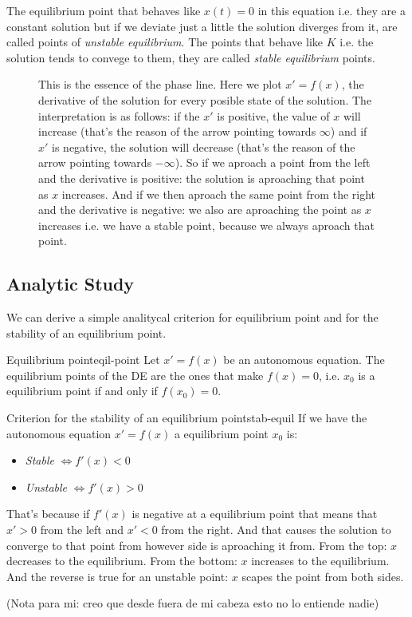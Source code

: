 \documentclass[../ode.tex]{subfiles}
\begin{document}
    The equilibrium point that behaves like $x(t)=0$ in this equation i.e. they are a constant solution but if we deviate just a
    little the solution diverges from it, are called points of \emph{unstable equilibrium}. The points that behave like $K$ i.e. the
    solution tends to convege to them, they are called \emph{stable equilibrium} points.

    \begin{figure}[ht]
        \centering
        \caption{This is the essence of the phase line. Here we plot $x'=f(x)$, the derivative of the solution for every posible
        state of the solution.
        The interpretation is as follows: if the $x'$ is positive, the value
        of $x$ will increase
        (that's the reason of the arrow pointing towards $\infty$) and if $x'$ is negative, the solution will decrease
        (that's the reason of the arrow pointing towards $-\infty$). So if we aproach a point from the left and the derivative is
        positive: the solution is aproaching that point as $x$ increases. And if we then aproach the same point from the right and the derivative
        is negative: we also are aproaching the point as $x$ increases i.e. we have a stable point, because we always aproach that
        point.}
        \label{fig:}
    \end{figure}
 
        \subsection{\sffamily Analytic Study}
    We can derive a simple analitycal criterion for equilibrium point and for the stability of an equilibrium point.

    \begin{prop}{Equilibrium point}{eqil-point}
        Let $x'=f(x)$ be an autonomous equation. The equilibrium points of the DE are the ones that make $f(x)=0$, i.e. $x_0$ is a
        equilibrium point if and only if $f(x_0)=0$.
    \end{prop}
        
    \begin{prop}{Criterion for the stability of an equilibrium point}{stab-equil}
        If we have the autonomous equation $x'=f(x)$ a equilibrium point $x_0$ is:
        \begin{itemize}
            \item \emph{Stable} $\iff f'(x)<0$
            \item \emph{Unstable}  $\iff f'(x)>0$
        \end{itemize} 
        That's because if $f'(x)$ is negative at a equilibrium point that means that $x'>0$ from the left and $x'<0$ from the
        right. And that causes the solution to converge to that point from however side is aproaching it from. From the top: $x$
        decreases to the equilibrium. From the bottom: $x$ increases to the equilibrium. And the reverse is true for an unstable
        point: $x$ scapes the point from both sides. 

        (Nota para mi: creo que desde fuera de mi cabeza esto no lo entiende nadie)
    \end{prop}
\end{document}
